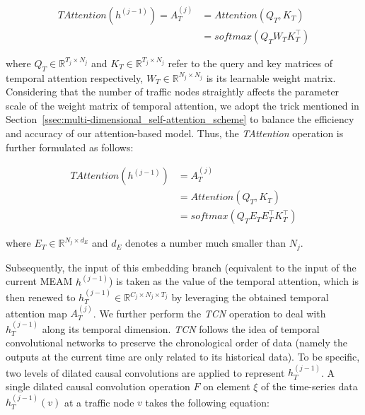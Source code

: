 \begin{equation}
    \label{eqn:temporal_attention}
    \begin{aligned}
        TAttention(h^{(j-1)})  = A_T^{(j)} & = Attention(Q_T, K_T)      \\
                                           & = softmax(Q_T W_T K_T^\top)
    \end{aligned}
\end{equation}

where $Q_T \in \mathbb{R}^{T_j \times N_j}$ and $K_T \in \mathbb{R}^{T_j \times N_j}$ refer to the query and key matrices of temporal attention respectively, $W_T \in \mathbb{R}^{N_j \times N_j}$ is its learnable weight matrix. Considering that the number of traffic nodes straightly affects the parameter scale of the weight matrix of temporal attention, we adopt the trick mentioned in Section~\ref{ssec:multi-dimensional_self-attention_scheme} to balance the efficiency and accuracy of our attention-based model. Thus, the \textit{TAttention} operation is further formulated as follows:

\begin{equation}
    \label{eqn:trick_temporal_attention}
    \begin{aligned}
        TAttention(h^{(j-1)}) & = A_T^{(j)}                        \\
                              & = Attention(Q_T, K_T)              \\
                              & = softmax(Q_T E_T E_T^\top K_T^\top)
    \end{aligned}
\end{equation}

where $E_T \in \mathbb{R}^{N_j \times d_E}$ and $d_E$ denotes a number much smaller than $N_j$.

Subsequently, the input of this embedding branch (equivalent to the input of the current MEAM $h^{(j-1)}$) is taken as the value of the temporal attention, which is then renewed to $h_T^{(j-1)} \in \mathbb{R}^{C_j \times N_j \times T_j}$ by leveraging the obtained temporal attention map $A_T^{(j)}$. We further perform the \textit{TCN} operation to deal with $h_T^{(j-1)}$ along its temporal dimension. \textit{TCN} follows the idea of temporal convolutional networks \cite{bai2018empirical} to  preserve the chronological order of data (namely the outputs at the current time are only related to its historical data). To be specific, two levels of dilated causal convolutions are applied to represent $h_T^{(j-1)}$. A single dilated causal convolution operation $F$ on element $\xi$ of the time-series data $h_T^{(j-1)}(v)$ at a traffic node $v$ takes the following equation:

